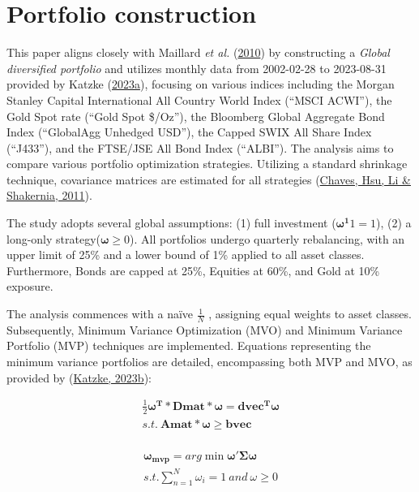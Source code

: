 \documentclass[12pt,preprint, authoryear]{elsarticle}
\numberwithin{equation}{section}
\numberwithin{figure}{section}
\numberwithin{table}{section}
\begin{document}
\hypertarget{portfolio-construction}{%
\section{Portfolio construction}\label{portfolio-construction}}

This paper aligns closely with Maillard \emph{et al.}
(\protect\hyperlink{ref-maillard2010properties}{2010}) by constructing a
\emph{Global diversified portfolio} and utilizes monthly data from
2002-02-28 to 2023-08-31 provided by Katzke
(\protect\hyperlink{ref-katzke2023portfoliocourse}{2023a}), focusing on
various indices including the Morgan Stanley Capital International All
Country World Index (``MSCI ACWI''), the Gold Spot rate (``Gold Spot
\$/Oz''), the Bloomberg Global Aggregate Bond Index (``GlobalAgg
Unhedged USD''), the Capped SWIX All Share Index (``J433''), and the
FTSE/JSE All Bond Index (``ALBI''). The analysis aims to compare various
portfolio optimization strategies. Utilizing a standard shrinkage
technique, covariance matrices are estimated for all strategies
(\protect\hyperlink{ref-chaves2011risk}{Chaves, Hsu, Li \& Shakernia,
2011}).

The study adopts several global assumptions: (1) full investment
(\(\boldsymbol{\omega^1} 1=1\)), (2) a long-only
strategy(\(\boldsymbol{\omega} \ge 0\)). All portfolios undergo
quarterly rebalancing, with an upper limit of 25\% and a lower bound of
1\% applied to all asset classes. Furthermore, Bonds are capped at 25\%,
Equities at 60\%, and Gold at 10\% exposure.

The analysis commences with a \textnormal{na\"{i}ve} \(\frac{1}{N}\) ,
assigning equal weights to asset classes. Subsequently, Minimum Variance
Optimization (MVO) and Minimum Variance Portfolio (MVP) techniques are
implemented. Equations representing the minimum variance portfolios are
detailed, encompassing both MVP and MVO, as provided by
(\protect\hyperlink{ref-katzke2023portfolio}{Katzke, 2023b}):

\begin{align}
\frac{1}{2} \boldsymbol{\omega^T*Dmat*\omega}=\boldsymbol{dvec^T\omega} \\
s.t. \ \boldsymbol{Amat * \omega \ge bvec}\\
\end{align}

\begin{align}
 \boldsymbol{\omega_{mvp}}= arg \min \boldsymbol{\omega' \Sigma\omega} \\
  s.t. \sum_{n=1}^{N} \omega_i = 1 \ and\ \omega \ge 0
\end{align}
\end{document}
